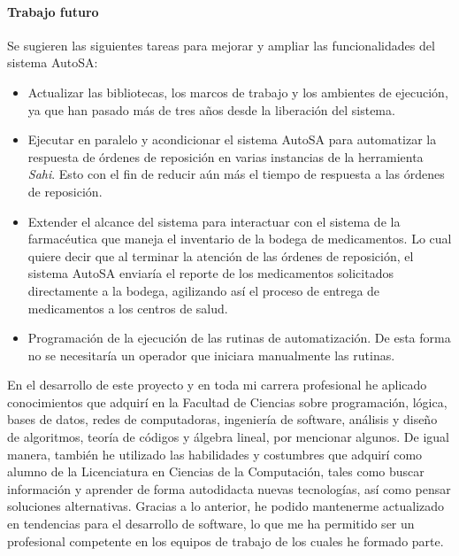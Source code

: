 \paragraph{Trabajo futuro\\}
Se sugieren las siguientes tareas para mejorar y ampliar las funcionalidades del sistema AutoSA:
\begin{itemize}
	\item Actualizar las bibliotecas, los marcos de trabajo y los ambientes de ejecución, ya que han pasado más de tres años desde la liberación del sistema.
	\item Ejecutar en paralelo y acondicionar el sistema AutoSA para automatizar la respuesta de órdenes de reposición en varias instancias de la herramienta \textit{Sahi}. Esto con el fin de reducir aún más el tiempo de respuesta a las órdenes de reposición.
	\item Extender el alcance del sistema para interactuar con el sistema de la farmacéutica que maneja el inventario de la bodega de medicamentos. Lo cual quiere decir que al terminar la atención de las órdenes de reposición, el sistema AutoSA enviaría el reporte de los medicamentos solicitados directamente a la bodega, agilizando así el proceso de entrega de medicamentos a los centros de salud. 
	\item Programación de la ejecución de las rutinas de automatización. De esta forma no se necesitaría un operador que iniciara manualmente las rutinas.
\end{itemize}
En el desarrollo de este proyecto y en toda mi carrera profesional he aplicado conocimientos que adquirí en la Facultad de Ciencias sobre programación, lógica, bases de datos, redes de computadoras, ingeniería de software, análisis y diseño de algoritmos, teoría de códigos y álgebra lineal, por mencionar algunos. De igual manera, también he utilizado las habilidades y costumbres que adquirí como alumno de la Licenciatura en Ciencias de la Computación, tales como buscar información y aprender de forma autodidacta nuevas tecnologías, así como pensar soluciones alternativas. Gracias a lo anterior, he podido mantenerme actualizado en tendencias para el desarrollo de software, lo que me ha permitido ser un profesional competente en los equipos de trabajo de los cuales he formado parte.\\
